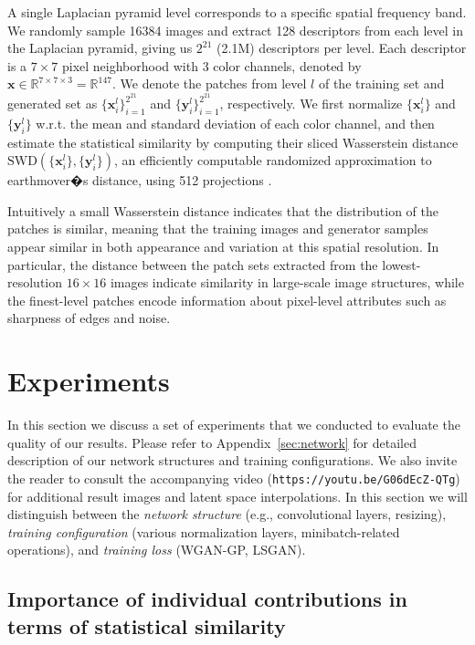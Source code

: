 A single Laplacian pyramid level corresponds to a specific spatial frequency band. We randomly sample 16384 images and extract 128 descriptors from each level in the Laplacian pyramid, giving us $2^{21}$ (2.1M) descriptors per level. Each descriptor is a $7\times7$ pixel neighborhood with 3 color channels, denoted by $\boldsymbol{x}\in \mathbb{R}^{7\times 7\times 3}=\mathbb{R}^{147}$. We denote the patches from level $l$ of the training set and generated set as $\{\boldsymbol{x}^l_i\}_{i=1}^{2^{21}}$ and $\{\boldsymbol{y}^l_i\}_{i=1}^{2^{21}}$, respectively. We first normalize $\{\boldsymbol{x}^l_i\}$ and $\{\boldsymbol{y}^l_i\}$ w.r.t. the mean and standard deviation of each color channel, and then estimate the statistical similarity by computing their sliced Wasserstein distance $\mathrm{SWD}(\{\boldsymbol{x}^l_i\}, \{\boldsymbol{y}^l_i\})$, an efficiently computable randomized approximation to earthmover�s distance, using 512 projections \citep{Rabin2011}.

Intuitively a small Wasserstein distance indicates that the distribution of the patches is similar, meaning that the training images and generator samples appear {similar in both appearance and variation} at this spatial resolution. In particular, the distance between the patch sets extracted from the lowest-resolution $16\times 16$ images indicate similarity in large-scale image structures, while the finest-level patches encode information about pixel-level attributes such as sharpness of edges and noise. 

\section{Experiments}
\label{sec:results}

In this section we discuss a set of experiments that we conducted to evaluate the quality of our results. Please refer to Appendix~\ref{sec:network} for detailed description of our network structures and training configurations. We also invite the reader to consult the accompanying video (\texttt{\small{https://youtu.be/G06dEcZ-QTg}}) for additional result images and latent space interpolations. In this section we will distinguish between the \emph{network structure} (e.g., convolutional layers, resizing), \emph{training configuration} (various normalization layers, minibatch-related operations), and \emph{training loss} (WGAN-GP, LSGAN).

\subsection{Importance of individual contributions in terms of statistical similarity}
\label{sec:exp-image-quality}

